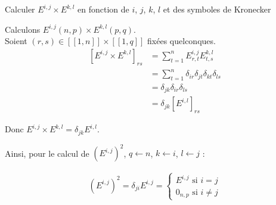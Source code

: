 \documentclass{article}
\begin{document}
	{Calculer $E^{i,j} \times E^{k,l}$ en fonction de $i$, $j$, $k$, $l$ et des symboles de Kronecker}

	Calculons $E^{i,j}(n,p) \times E^{k,l}(p,q)$.\\
	Soient $(r, s) \in [ \! [ 1, n] \!] \times [ \! [ 1, q ] \!]$ fixées quelconques.
	\begin{align*}
		\left[ E^{i,j} \times E^{k,l} \right] _{rs}
		 & = \sum_{t = 1}^{n}E^{i,j}_{r,t} E^{k,l}_{t,s}                     \\
		 & =\sum_{t = 1}^{n} \delta_{ir} \delta_{jt} \delta_{kt} \delta_{ls} \\
		 & = \delta_{jk} \delta_{ir} \delta_{ls}                             \\
		 & = \delta_{jk} \left[ E^{i,l} \right] _{rs}
	\end{align*}

	Donc $E^{i,j} \times E^{k,l} = \delta_{jk} E^{i,l}$.


	Ainsi, pour le calcul de $(E^{i,j})^{2}$, $q \leftarrow n$, $k \leftarrow i$, $l \leftarrow j$ :

	\begin{align*}
		(E^{i,j})^{2} = \delta_{ji} E^{i,j} = \left\{
		\begin{array}{ll}
			E^{i,j} \text{ si } i = j \\
			0_{n,p} \text{ si } i \neq j
		\end{array}
		\right.
	\end{align*}

\end{question_kholle}
\end{document}
